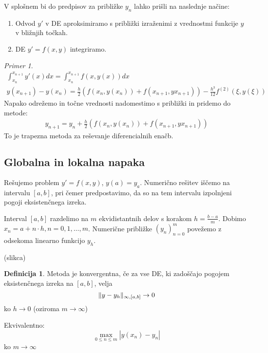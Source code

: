 \documentclass[a4paper,12pt]{article}
\DeclarePairedDelimiter\norm{\lVert}{\rVert}
\theoremstyle{definition}
\newtheorem{defn}[counter]{Definicija}
\theoremstyle{remark}
\newtheorem*{ex}{Primer}
\begin{document}
V splošnem bi do predpisov za približke $y_n$ lahko prišli na naslednje načine:

\begin{enumerate}
    \item Odvod $y'$ v DE aproksimiramo s približki izraženimi z vrednostmi funkcije $y$ v bližnjih točkah.
    \item DE $y' = f(x, y)$ integriramo.
\end{enumerate}


\begin{ex}
    \begin{gather*}
        \int_{x_n}^{x_{n+1}} y'(x) dx = \int_{x_n}^{x_{n+1}} f(x, y(x)) dx \\
        y(x_{n+1}) - y(x_n) = \frac{h}{2} (f(x_n, y(x_n)) + f(x_{n+1}, yx_{n+1})) - \frac{h^3}{12} f^{(2)}(\xi, y(\xi))
    \end{gather*}
    Napako odrežemo in točne vrednosti nadomestimo s približki in pridemo do metode:
    \begin{gather*}
        y_{n+1} = y_n + \frac{h}{2} (f(x_n, y(x_n)) + f(x_{n+1}, yx_{n+1}))
    \end{gather*}
    To je trapezna metoda za reševanje diferencialnih enačb.
\end{ex}


\subsection{Globalna in lokalna napaka}

Rešujemo problem $y' = f(x, y)$, $y(a) = y_a$. Numerično rešitev iščemo na intervalu $[a, b]$, pri čemer predpostavimo, 
da so na tem intervalu izpolnjeni pogoji eksistenčnega izreka.

Interval $[a, b]$ razdelimo na $m$ ekvidistantnih delov s korakom $h = \frac{b-a}{m}$. Dobimo $x_n = a + n \cdot h, n = 0, 1, \dots, m$.
Numerične približke $(y_n)_{n=0}^m$ povežemo z odsekoma linearno funkcijo $y_h$.

(slikca)

\begin{defn}
    Metoda je konvergentna, če za vse DE, ki zadoščajo pogojem eksistenčnega izreka na $[a, b]$, velja
    \begin{equation*}
        \norm{y-y_h}_{\infty, [a, b]} \to 0
    \end{equation*}
    ko $h \to 0$ (oziroma $m \to \infty$)
    
    Ekvivalentno:
    \begin{equation*}
        \max_{0 \leq n \leq m} |y(x_n) - y_n|
    \end{equation*}
    ko $m \to \infty$
\end{defn}
\end{document}
